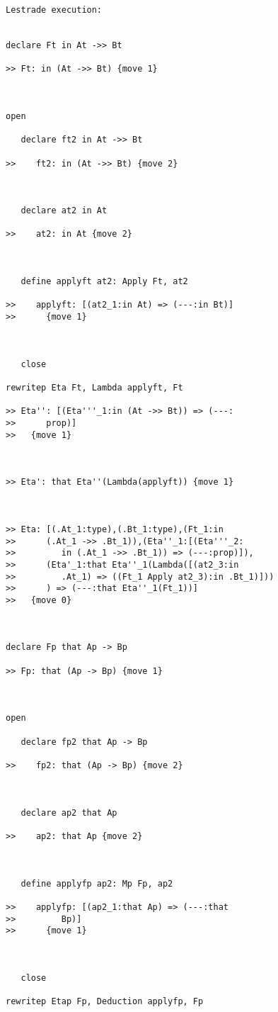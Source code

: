 \documentclass{article}
\begin{document}
\begin{verbatim}Lestrade execution:


declare Ft in At ->> Bt

>> Ft: in (At ->> Bt) {move 1}



open

   declare ft2 in At ->> Bt

>>    ft2: in (At ->> Bt) {move 2}



   declare at2 in At

>>    at2: in At {move 2}



   define applyft at2: Apply Ft, at2

>>    applyft: [(at2_1:in At) => (---:in Bt)]
>>      {move 1}



   close

rewritep Eta Ft, Lambda applyft, Ft

>> Eta'': [(Eta'''_1:in (At ->> Bt)) => (---:
>>      prop)]
>>   {move 1}



>> Eta': that Eta''(Lambda(applyft)) {move 1}



>> Eta: [(.At_1:type),(.Bt_1:type),(Ft_1:in
>>      (.At_1 ->> .Bt_1)),(Eta''_1:[(Eta'''_2:
>>         in (.At_1 ->> .Bt_1)) => (---:prop)]),
>>      (Eta'_1:that Eta''_1(Lambda([(at2_3:in
>>         .At_1) => ((Ft_1 Apply at2_3):in .Bt_1)]))
>>      ) => (---:that Eta''_1(Ft_1))]
>>   {move 0}



declare Fp that Ap -> Bp

>> Fp: that (Ap -> Bp) {move 1}



open

   declare fp2 that Ap -> Bp

>>    fp2: that (Ap -> Bp) {move 2}



   declare ap2 that Ap

>>    ap2: that Ap {move 2}



   define applyfp ap2: Mp Fp, ap2

>>    applyfp: [(ap2_1:that Ap) => (---:that
>>         Bp)]
>>      {move 1}



   close

rewritep Etap Fp, Deduction applyfp, Fp


\end{verbatim}
\end{document}

